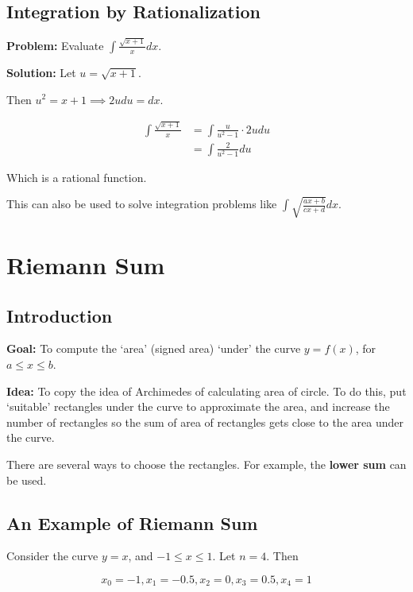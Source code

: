 \subsection{Integration by Rationalization}

\textbf{Problem:} Evaluate $\int \frac{\sqrt{x+1}}{x} dx$.

\textbf{Solution:} Let $u = \sqrt{x + 1}$.

Then $u^2 = x + 1 \implies 2u du = dx$.

\begin{equation*}
\begin{split}
    \int \frac{\sqrt{x + 1}}{x}
    &= \int \frac{u}{u^2 - 1} \cdot 2u du\\
    &= \int \frac{2}{u^2 - 1} du
\end{split}
\end{equation*}

Which is a rational function.

This can also be used to solve integration problems like $\int \sqrt{\frac{ax + b}{cx + d}} dx$.

\section{Riemann Sum}

\subsection{Introduction}

\textbf{Goal:} To compute the `area' (signed area) `under' the curve $y = f(x)$, for $a \leq x \leq b$.

\textbf{Idea:} To copy the idea of Archimedes of calculating area of circle. To do this, put `suitable' rectangles under the curve to approximate the area, and increase the number of rectangles so the sum of area of rectangles gets close to the area under the curve.

There are several ways to choose the rectangles. For example, the \textbf{lower sum} can be used.

\subsection{An Example of Riemann Sum}

Consider the curve $y = x$, and $-1 \leq x \leq 1$. Let $n = 4$. Then

$$ x_0 = -1, x_1 = -0.5, x_2 = 0, x_3 = 0.5, x_4 = 1 $$

